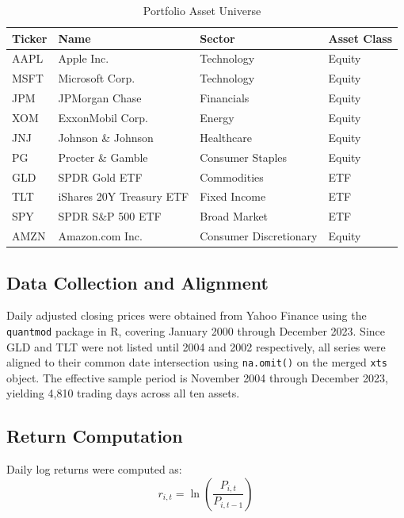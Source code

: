 \documentclass[12pt]{article}
\begin{document}
\begin{table}[H]
  \centering
  \caption{Portfolio Asset Universe}
  \label{tab:assets}
  \begin{tabular}{llll}
    \toprule
    Ticker & Name & Sector & Asset Class \\
    \midrule
    AAPL & Apple Inc.                 & Technology             & Equity \\
    MSFT & Microsoft Corp.            & Technology             & Equity \\
    JPM  & JPMorgan Chase             & Financials             & Equity \\
    XOM  & ExxonMobil Corp.           & Energy                 & Equity \\
    JNJ  & Johnson \& Johnson         & Healthcare             & Equity \\
    PG   & Procter \& Gamble          & Consumer Staples       & Equity \\
    GLD  & SPDR Gold ETF              & Commodities            & ETF    \\
    TLT  & iShares 20Y Treasury ETF   & Fixed Income           & ETF    \\
    SPY  & SPDR S\&P 500 ETF          & Broad Market           & ETF    \\
    AMZN & Amazon.com Inc.            & Consumer Discretionary & Equity \\
    \bottomrule
  \end{tabular}
\end{table}

\subsection{Data Collection and Alignment}

Daily adjusted closing prices were obtained from Yahoo Finance using the
\texttt{quantmod} package in R, covering January 2000 through December 2023.
Since GLD and TLT were not listed until 2004 and 2002 respectively, all
series were aligned to their common date intersection using \texttt{na.omit()}
on the merged \texttt{xts} object. The effective sample period is November
2004 through December 2023, yielding 4,810 trading days across all ten assets.

\subsection{Return Computation}

Daily log returns were computed as:
\begin{equation}
  r_{i,t} = \ln\left(\frac{P_{i,t}}{P_{i,t-1}}\right)
\end{equation}
\end{document}
